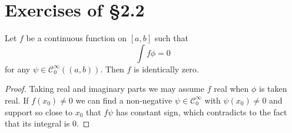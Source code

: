 \documentclass[
    ]{article}
\begin{document}
    \title{}
    \author{M. Hao}
    \date{\today}


    \section{Exercises of \S 2.2}
    \begin{exercise}
        Let $f$ be a continuous function on $[a,b]$ such that 
        \[\int f\phi=0\]
        for any $\psi\in\mathscr C_0^\infty((a,b))$. Then $f$ is identically zero.
    \end{exercise}
    \begin{proof}
        Taking real and imaginary parts we may assume $f$ real when $\phi$ is taken real. 
        If $f(x_0)\neq0$ we can find a non-negative $\psi\in\mathscr C_0^\infty$ with $\psi(x_0)\neq 0$ and support so close to $x_0$ that $f\psi$ has constant sign, 
        which contradicts to the fact that its integral is 0.
    \end{proof}
\end{document}
